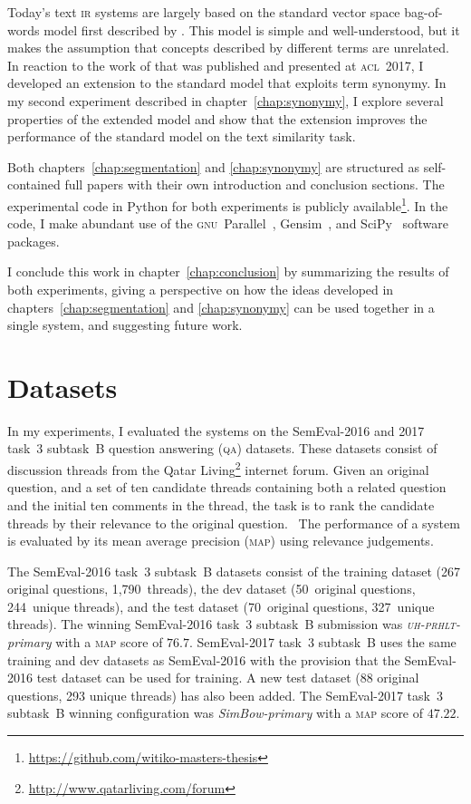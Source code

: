 \documentclass[
  digital, %
  notable, %
  lof,     %
  lot,     %
  nopalatino, color
]{fithesis3}
\def\abbr#1{\textsc{\MakeLowercase{#1}}}
\let\term\emph
\let\note=\footnote
\let\emph=\textit
\begin{document}
Today's text \abbr{IR}\index{ir@\abbr {IR}} systems are largely based on the
standard vector space bag-of-words model first described by
\textcite{ir:Salton1975}. This model is simple and well-understood, but it makes the assumption
that concepts described by different terms are unrelated. In reaction to the
work of \textcite{charletdamnati17} that was published and presented at
\abbr{ACL}\index{acl@\abbr{ACL}}~2017, I developed an extension to the standard
model that exploits term synonymy. In my second experiment described in
chapter~\ref{chap:synonymy}, I explore several properties of the extended
model and show that the extension improves the
performance of the standard model on the text similarity task.

Both chapters~\ref{chap:segmentation} and \ref{chap:synonymy} are structured as
self-contained full papers with their own introduction and conclusion sections.
The experimental code in Python for both experiments is publicly
available\note{\url{https://github.com/witiko-masters-thesis}}. In the code, I
make abundant use of the \abbr{GNU}~Parallel~\cite{Tange2011a},
Gensim~\cite{rehurek_lrec}, and SciPy~\cite{scipy} software packages.

I conclude this work in chapter~\ref{chap:conclusion} by summarizing the
results of both experiments, giving a perspective on how the ideas developed in
chapters~\ref{chap:segmentation} and \ref{chap:synonymy} can be used together
in a single system, and suggesting future work.

\chapter{Datasets}
\label{chap:datasets}
In my experiments, I evaluated the systems on the SemEval-2016 and 2017
task~3 subtask~B question answering (\abbr{QA})\index{qa@\abbr{QA}} datasets.
These datasets consist of discussion threads from the Qatar
Living\note{\url{http://www.qatarliving.com/forum}} internet forum. Given
an original question, and a set of ten candidate threads containing both a
related question and the initial ten comments in the thread, the task is to
rank the candidate threads by their relevance to the original
question.~\cite{preslavetal16,nakov2017semeval} The performance of a system
is evaluated by its mean average precision\index{map@\abbr {MAP}|emph}
(\abbr{MAP}) using relevance judgements.

The SemEval-2016 task~3 subtask~B datasets consist of the training dataset (267
original questions, 1,790~threads), the dev dataset (50~original questions,
244~unique threads), and the test dataset (70~original questions, 327~unique
threads). The winning SemEval-2016 task~3 subtask~B submission was
\term{\abbr{UH-PRHLT}-primary} with a \abbr{MAP}\index{map@\abbr {MAP}} score of
$76.7$. SemEval-2017 task~3 subtask~B uses the same training and dev datasets as
SemEval-2016 with the provision that the SemEval-2016 test dataset can be used
for training. A new test dataset (88 original questions, 293 unique threads)
has also been added.  The SemEval-2017 task~3 subtask~B winning configuration
was \term{SimBow-primary} with a \abbr{MAP}\index{map@\abbr {MAP}} score of $47.22$.
\end{document}
